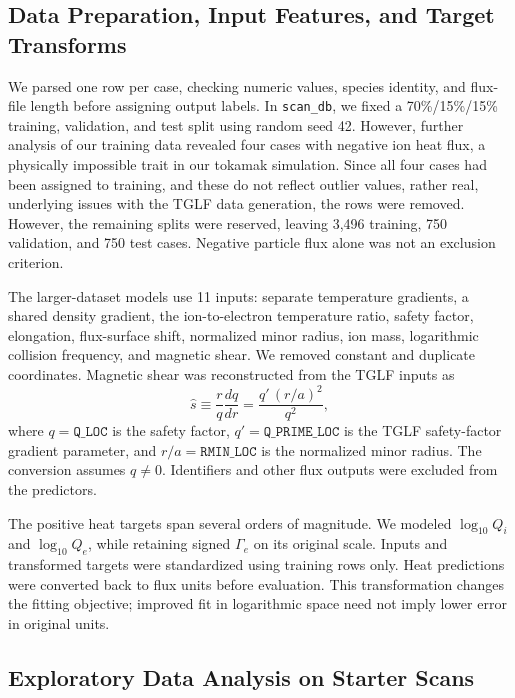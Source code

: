 \documentclass[12pt,letterpaper]{article}
\begin{document}
\subsection{Data Preparation, Input Features, and Target Transforms}

We parsed one row per case, checking numeric values, species identity, and
flux-file length before assigning output labels. In \texttt{scan\_db}, we
fixed a 70\%/15\%/15\% training, validation, and test split using random seed
42. However, further analysis of our training data revealed four cases with
negative ion heat flux, a physically impossible trait in our tokamak simulation.
Since all four cases had been assigned to training, and these do not reflect
outlier values, rather real, underlying issues with the TGLF data generation, the rows were removed.
However, the remaining splits were reserved, leaving 3,496
training, 750 validation, and 750 test cases. Negative particle flux alone
was not an exclusion criterion.

The larger-dataset models use 11 inputs: separate temperature gradients, a
shared density gradient, the ion-to-electron temperature ratio, safety factor,
elongation, flux-surface shift, normalized minor radius, ion mass, logarithmic
collision frequency, and magnetic shear. We removed constant and duplicate
coordinates. Magnetic shear was reconstructed from the TGLF inputs as
\[
  \hat{s} \equiv \frac{r}{q}\frac{dq}{dr}
  = \frac{q'\,(r/a)^{2}}{q^{2}},
\]
where $q=\mathtt{Q\_LOC}$ is the safety factor, $q'=\mathtt{Q\_PRIME\_LOC}$ is
the TGLF safety-factor gradient parameter, and $r/a=\mathtt{RMIN\_LOC}$ is the
normalized minor radius. The conversion assumes $q\neq 0$.
Identifiers and other flux outputs were excluded from the predictors.

The positive heat targets span several orders of magnitude. We modeled
$\log_{10}Q_i$ and $\log_{10}Q_e$, while retaining signed $\Gamma_e$ on its
original scale. Inputs and transformed targets were standardized using
training rows only. Heat predictions were converted back to flux units before
evaluation. This transformation changes the fitting objective; improved fit
in logarithmic space need not imply lower error in original units.

\subsection{Exploratory Data Analysis on Starter Scans}
\end{document}
